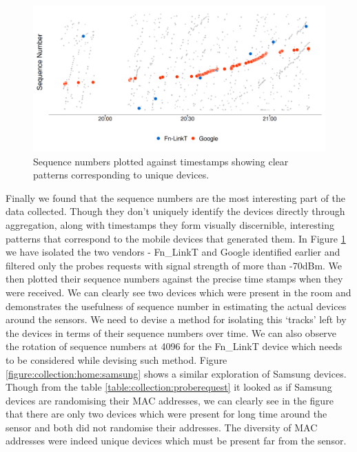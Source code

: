 \begin{figure}
  \includegraphics[trim = {0 10 0 0}, clip]{images/home-sequence-time.png}
  \caption{Sequence numbers plotted against timestamps showing clear patterns corresponding to unique devices.}
  \label{figure:collection:home:sequence}
\end{figure}

Finally we found that the sequence numbers are the most interesting part of the data collected. 
Though they don't uniquely identify the devices directly through aggregation, along with timestamps they form visually discernible, interesting patterns that correspond to the mobile devices that generated them.
In Figure \ref{figure:collection:home:sequence} we have isolated the two vendors - Fn\_LinkT and Google identified earlier and filtered only the probes requests with signal strength of more than -70dBm.
We then plotted their sequence numbers against the precise time stamps when they were received.
We can clearly see two devices which were present in the room and demonstrates the usefulness of sequence number in estimating the actual devices around the sensors.
We need to devise a method for isolating this `tracks' left by the devices in terms of their sequence numbers over time.
We can also observe the rotation of sequence numbers at 4096 for the Fn\_LinkT device which needs to be considered while devising such method.
Figure \ref{figure:collection:home:samsung} shows a similar exploration of Samsung devices.
Though from the table \ref{table:collection:proberequest} it looked as if Samsung devices are randomising their MAC addresses, we can clearly see in the figure that there are only two devices which were present for long time around the sensor and both did not randomise their addresses.
The diversity of MAC addresses were indeed unique devices which must be present far from the sensor.

